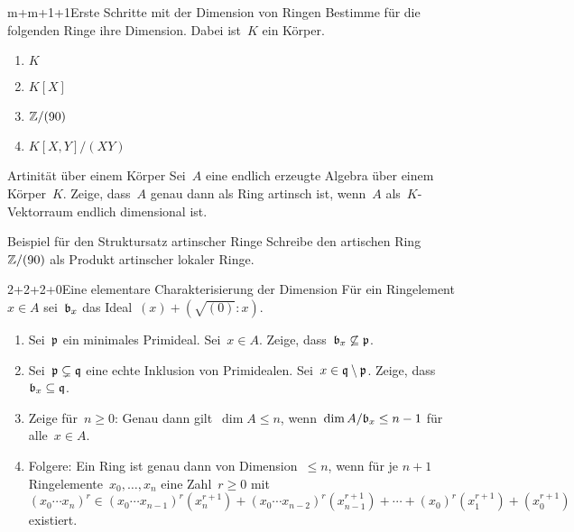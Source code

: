\documentclass[entwurf]{uebblatt}
\begin{document}

\begin{aufgabe}{m+m+1+1}{Erste Schritte mit der Dimension von Ringen}
Bestimme für die folgenden Ringe ihre Dimension. Dabei ist~$K$ ein Körper.
\begin{enumerate}
\item $K$
\item $K[X]$
\item $\mathbb{Z}/(90)$
\item $K[X,Y]/(XY)$
\end{enumerate}
\end{aufgabe}

\begin{aufgabe}{}{Artinität über einem Körper}
Sei~$A$ eine endlich erzeugte Algebra über einem Körper~$K$. Zeige, dass~$A$
genau dann als Ring artinsch ist, wenn~$A$ als~$K$-Vektorraum endlich
dimensional ist.
\end{aufgabe}

\begin{aufgabe}{}{Beispiel für den Struktursatz artinscher Ringe}
Schreibe den artischen Ring~$\mathbb{Z}/(90)$ als Produkt artinscher lokaler Ringe.
\end{aufgabe}

\begin{aufgabe}{2+2+2+0}{Eine elementare Charakterisierung der Dimension}
Für ein Ringelement~$x \in A$ sei~$\mathfrak{b}_x$ das Ideal~$(x) + (\sqrt{(0)}:x)$.
\begin{enumerate}
\item Sei~$\mathfrak{p}$ ein minimales Primideal. Sei~$x \in A$. Zeige,
dass~$\mathfrak{b}_x \not\subseteq \mathfrak{p}$.
\item Sei~$\mathfrak{p} \subsetneq \mathfrak{q}$ eine echte Inklusion von Primidealen. Sei~$x
\in \mathfrak{q} \setminus \mathfrak{p}$. Zeige, dass~$\mathfrak{b}_x \subseteq \mathfrak{q}$.
\item Zeige für~$n \geq 0$: Genau dann gilt~$\dim A \leq n$, wenn~$\dim
A/\mathfrak{b}_x \leq n - 1$ für alle~$x \in A$.
\item Folgere: Ein Ring ist genau dann von Dimension~$\leq n$, wenn für
je $n+1$ Ringelemente~$x_0,\ldots,x_n$ eine Zahl~$r \geq 0$ mit
\[ (x_0 \cdots x_n)^r \in (x_0 \cdots x_{n-1})^r (x_n^{r+1}) +
  (x_0 \cdots x_{n-2})^r (x_{n-1}^{r+1}) + \cdots +
  (x_0)^r (x_1^{r+1}) + (x_0^{r+1}) \]
existiert.
\end{enumerate}
\end{aufgabe}
\end{document}
